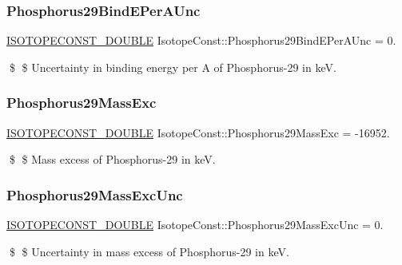 \subsubsection{\texorpdfstring{Phosphorus29\+Bind\+E\+Per\+A\+Unc}{Phosphorus29BindEPerAUnc}}
{\footnotesize\ttfamily \mbox{\hyperlink{group___isotope_const-_macros_ga8f45a7272ce02c0b4c65c44636ed719a}{I\+S\+O\+T\+O\+P\+E\+C\+O\+N\+S\+T\+\_\+\+D\+O\+U\+B\+LE}} Isotope\+Const\+::\+Phosphorus29\+Bind\+E\+Per\+A\+Unc = 0.}

\$ \$ Uncertainty in binding energy per A of Phosphorus-\/29 in keV. \mbox{\label{group___isotope_const-_phosphorus-_p29_ga3fcd3f9bde86e646c0f1c2da8534bccd}} 
\subsubsection{\texorpdfstring{Phosphorus29\+Mass\+Exc}{Phosphorus29MassExc}}
{\footnotesize\ttfamily \mbox{\hyperlink{group___isotope_const-_macros_ga8f45a7272ce02c0b4c65c44636ed719a}{I\+S\+O\+T\+O\+P\+E\+C\+O\+N\+S\+T\+\_\+\+D\+O\+U\+B\+LE}} Isotope\+Const\+::\+Phosphorus29\+Mass\+Exc = -\/16952.}

\$ \$ Mass excess of Phosphorus-\/29 in keV. \mbox{\label{group___isotope_const-_phosphorus-_p29_ga6a90af78642a08671e62d9652d54c5b7}} 
\subsubsection{\texorpdfstring{Phosphorus29\+Mass\+Exc\+Unc}{Phosphorus29MassExcUnc}}
{\footnotesize\ttfamily \mbox{\hyperlink{group___isotope_const-_macros_ga8f45a7272ce02c0b4c65c44636ed719a}{I\+S\+O\+T\+O\+P\+E\+C\+O\+N\+S\+T\+\_\+\+D\+O\+U\+B\+LE}} Isotope\+Const\+::\+Phosphorus29\+Mass\+Exc\+Unc = 0.}

\$ \$ Uncertainty in mass excess of Phosphorus-\/29 in keV. \mbox{\label{group___isotope_const-_phosphorus-_p29_ga28252ff9dd76625a47d9bfb2293c9c9d}} 
